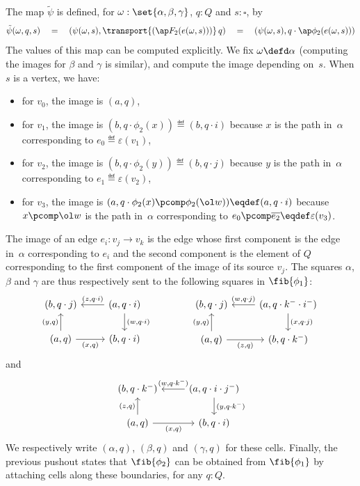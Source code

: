 \documentclass[a4paper]{article}
\begin{document}
The map $\tilde\psi$ is defined, for $\omega:\set{\alpha,\beta,\gamma}$, $q:Q$ and $s:\square$, by
\[
  \tilde\psi(\omega,q,s)
  \quad=\quad
  (\psi(\omega,s),\transport{(\ap F_2(e(\omega,s)))}\,q)
  \quad=\quad
  (\psi(\omega,s),q\cdot\ap\phi_2(e(\omega,s)))
\]
The values of this map can be computed explicitly. We fix $\omega\defd\alpha$ (computing the images for $\beta$ and $\gamma$ is similar), and compute the image depending on~$s$. When $s$ is a vertex, we have:
\begin{itemize}
\item for $v_0$, the image is $(a,q)$,
\item for $v_1$, the image is $(b,q\cdot\phi_2(x))\eqdef(b,q\cdot i)$ because $x$ is the path in~$\alpha$ corresponding to $e_0\eqdef\varepsilon(v_1)$,
\item for $v_2$, the image is $(b,q\cdot\phi_2(y))\eqdef(b,q\cdot j)$ because $y$ is the path in~$\alpha$ corresponding to $e_1\eqdef\varepsilon(v_2)$,
\item for $v_3$, the image is $(a,q\cdot\phi_2(x)\pcomp\phi_2(\ol w))\eqdef(a,q\cdot i)$ because $x\pcomp\ol w$ is the path in~$\alpha$ corresponding to $e_0\pcomp\overline{e_2}\eqdef\varepsilon(v_3)$.
\end{itemize}
The image of an edge $e_i:v_j\to v_k$ is the edge whose first component is the edge in~$\alpha$ corresponding to $e_i$ and the second component is the element of $Q$ corresponding to the first component of the image of its source $v_j$.
%
The squares $\alpha$, $\beta$ and $\gamma$ are thus respectively sent to the following squares in $\fib{\phi_1}$:
\[
  \begin{tikzcd}
    (b,q\cdot j)&\ar[l,"{(z,q\cdot i)}"']\ar[d,"{(w,q\cdot i)}"](a,q\cdot i)\\
    (a,q)\ar[u,"{(y,q)}"]\ar[r,"{(x,q)}"']&(b,q\cdot i)
  \end{tikzcd}
  \qquad\qquad
  \begin{tikzcd}
    (b,q\cdot j)&\ar[l,"{(w,q\cdot j)}"']\ar[d,"{(x,q\cdot j)}"](a,q\cdot k^-\cdot i^-)\\
    (a,q)\ar[u,"{(y,q)}"]\ar[r,"{(z,q)}"']&(b,q\cdot k^-)
  \end{tikzcd}
\]
and
\[
  \begin{tikzcd}
    (b,q\cdot k^-)&\ar[l,"{(w,q\cdot k^-)}"']\ar[d,"{(y,q\cdot k^-)}"](a,q\cdot i\cdot j^-)\\
    (a,q)\ar[u,"{(z,q)}"]\ar[r,"{(x,q)}"']&(b,q\cdot i)
  \end{tikzcd}
\]
We respectively write $(\alpha,q)$, $(\beta,q)$ and $(\gamma,q)$ for these cells.
%
Finally, the previous pushout states that $\fib{\phi_2}$ can be obtained from $\fib{\phi_1}$ by attaching cells along these boundaries, for any $q:Q$.
\end{document}
